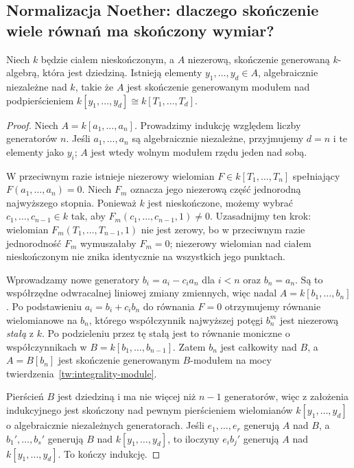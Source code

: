 \subsection{Normalizacja Noether: dlaczego skończenie wiele równań ma skończony wymiar?}
\begin{twierdzenie}
\label{tw:noether-norm}
Niech $k$ będzie ciałem nieskończonym, a $A$
niezerową, skończenie generowaną $k$-algebrą,
która jest dziedziną. Istnieją elementy
$y_1,\ldots,y_d\in A$, algebraicznie niezależne
nad $k$, takie że $A$ jest skończenie generowanym
modułem nad podpierścieniem
$k[y_1,\ldots,y_d]\cong k[T_1,\ldots,T_d]$.
\end{twierdzenie}
\begin{proof}
Niech $A=k[a_1,\ldots,a_n]$. Prowadzimy indukcję
względem liczby generatorów $n$. Jeśli
$a_1,\ldots,a_n$ są algebraicznie niezależne,
przyjmujemy $d=n$ i te elementy jako $y_i$;
$A$ jest wtedy wolnym modułem rzędu jeden nad sobą.

W przeciwnym razie istnieje niezerowy wielomian
$F\in k[T_1,\ldots,T_n]$ spełniający
$F(a_1,\ldots,a_n)=0$. Niech $F_m$ oznacza
jego niezerową część jednorodną najwyższego stopnia.
Ponieważ $k$ jest nieskończone, możemy wybrać
$c_1,\ldots,c_{n-1}\in k$ tak, aby
$F_m(c_1,\ldots,c_{n-1},1)\ne0$.
Uzasadnijmy ten krok: wielomian
$F_m(T_1,\ldots,T_{n-1},1)$ nie jest zerowy,
bo w przeciwnym razie jednorodność $F_m$
wymuszałaby $F_m=0$; niezerowy wielomian
nad ciałem nieskończonym nie znika identycznie
na wszystkich jego punktach.

Wprowadzamy nowe generatory
$b_i=a_i-c_i a_n$ dla $i<n$ oraz $b_n=a_n$.
Są to współrzędne odwracalnej liniowej zmiany
zmiennych, więc nadal $A=k[b_1,\ldots,b_n]$.
Po podstawieniu $a_i=b_i+c_i b_n$ do równania
$F=0$ otrzymujemy równanie wielomianowe
na $b_n$, którego współczynnik najwyższej potęgi
$b_n^m$ jest niezerową \emph{stałą} z $k$.
Po podzieleniu przez tę stałą jest to równanie
moniczne o współczynnikach w
$B=k[b_1,\ldots,b_{n-1}]$. Zatem $b_n$
jest całkowity nad $B$, a $A=B[b_n]$ jest
skończenie generowanym $B$-modułem na mocy
twierdzenia~\ref{tw:integrality-module}.

Pierścień $B$ jest dziedziną i ma nie więcej
niż $n-1$ generatorów, więc z założenia indukcyjnego
jest skończony nad pewnym pierścieniem wielomianów
$k[y_1,\ldots,y_d]$ o algebraicznie niezależnych
generatorach. Jeśli $e_1,\ldots,e_r$ generują
$A$ nad $B$, a $b_1',\ldots,b_s'$ generują $B$
nad $k[y_1,\ldots,y_d]$, to iloczyny $e_i b_j'$
generują $A$ nad $k[y_1,\ldots,y_d]$.
To kończy indukcję.
\end{proof}

